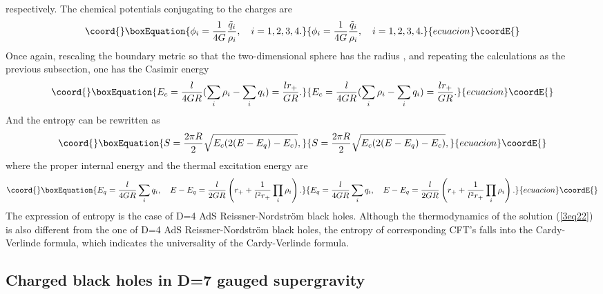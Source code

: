 \documentclass[a4paper,12pt]{article}
\begin{document}
respectively.  The chemical potentials \coordHE{} conjugating to the 
charges \coordHE{} are 
\begin{equation}\coord{}\boxEquation{
\phi _i = \frac{1}{4G}\frac{\tilde q_i}{\rho_i}, \ \ \  i=1, 2, 3, 4.
}{
\phi _i = \frac{1}{4G}\frac{\tilde q_i}{\rho_i}, \ \ \  i=1, 2, 3, 4.
}{ecuacion}\coordE{}\end{equation}
Once again, rescaling the boundary metric so that the two-dimensional
sphere has the radius \coordHE{}, and repeating the calculations as the
previous subsection, one has the Casimir energy
\begin{equation}\coord{}\boxEquation{
E_c= \frac{l}{4 GR}( \sum_i \rho_i-\sum_i q_i) =\frac{lr_+}{GR}.
}{
E_c= \frac{l}{4 GR}( \sum_i \rho_i-\sum_i q_i) =\frac{lr_+}{GR}.
}{ecuacion}\coordE{}\end{equation}
And the entropy can be rewritten as 
\begin{equation}\coord{}\boxEquation{
\label{3eq29}
S =\frac{2\pi R}{2}
   \sqrt{E_c(2(E-E_q)-E_c)}, 
}{
S =\frac{2\pi R}{2}
   \sqrt{E_c(2(E-E_q)-E_c)}, 
}{ecuacion}\coordE{}\end{equation}
where the proper internal energy and the thermal excitation energy are
\begin{equation}\coord{}\boxEquation{
E_q=\frac{l}{4GR}\sum_iq_i, \ \ \  E-E_q=\frac{l}{2GR}\left(r_+ 
     +\frac{1}{l^2r_+} \prod_i \rho_i\right).
}{
E_q=\frac{l}{4GR}\sum_iq_i, \ \ \  E-E_q=\frac{l}{2GR}\left(r_+ 
     +\frac{1}{l^2r_+} \prod_i \rho_i\right).
}{ecuacion}\coordE{}\end{equation} 
The expression of entropy is the case of D=4 AdS Reissner-Nordstr\"om
black holes.  Although the thermodynamics of the solution (\ref{3eq22}) is
also different from the one of D=4 AdS Reissner-Nordstr\"om black 
holes, the entropy of corresponding CFT's falls into the Cardy-Verlinde 
formula, which indicates the universality of the Cardy-Verlinde formula.  



\subsection{Charged black holes in D=7 gauged supergravity}
\end{document}
